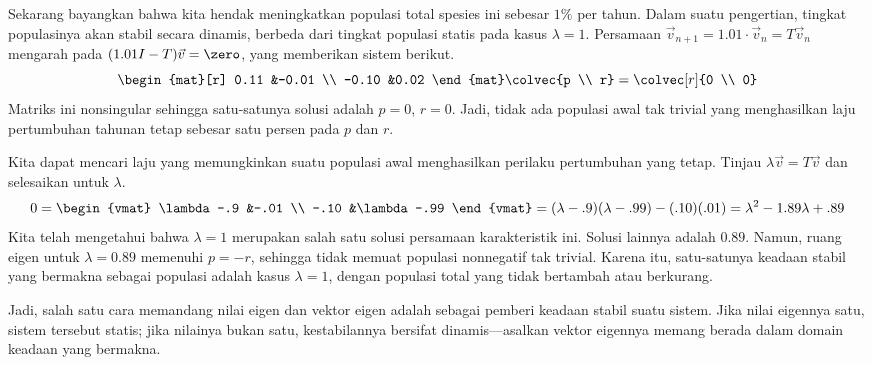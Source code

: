 Sekarang bayangkan bahwa kita hendak meningkatkan populasi total spesies ini
sebesar $1\%$ per tahun. Dalam suatu pengertian, tingkat populasinya akan stabil
secara dinamis, berbeda dari tingkat populasi statis pada kasus $\lambda=1$.
Persamaan $\vec{v}_{n+1}=1.01\cdot\vec{v}_n=T\vec{v}_{n}$ mengarah pada
$(1.01 I-T)\vec{v}=\zero$, yang memberikan sistem berikut.
\begin{equation*}
  \begin{mat}[r]
     0.11   &-0.01  \\
     -0.10  &0.02
  \end{mat}
  \colvec{p \\ r}=
  \colvec[r]{0 \\ 0}
\end{equation*}
Matriks ini nonsingular sehingga satu-satunya solusi adalah $p=0$, $r=0$.
Jadi, tidak ada populasi awal tak trivial yang menghasilkan laju pertumbuhan
tahunan tetap sebesar satu persen pada $p$ dan $r$.

Kita dapat mencari laju yang memungkinkan suatu populasi awal menghasilkan
perilaku pertumbuhan yang tetap. Tinjau $\lambda\vec{v}=T\vec{v}$ dan
selesaikan untuk $\lambda$.
\begin{equation*}
  0=\begin{vmat}
    \lambda-.9  &-.01  \\
    -.10        &\lambda-.99
  \end{vmat}
  =(\lambda-.9)(\lambda-.99)-(.10)(.01)
  =\lambda^2-1.89\lambda+.89
\end{equation*}
Kita telah mengetahui bahwa $\lambda=1$ merupakan salah satu solusi persamaan
karakteristik ini. Solusi lainnya adalah $0.89$. Namun, ruang eigen untuk
$\lambda=0.89$ memenuhi $p=-r$, sehingga tidak memuat populasi nonnegatif tak
trivial. Karena itu, satu-satunya keadaan stabil yang bermakna sebagai populasi
adalah kasus $\lambda=1$, dengan populasi total yang tidak bertambah atau
berkurang.
 
Jadi, salah satu cara memandang nilai eigen dan vektor eigen adalah sebagai
pemberi keadaan stabil suatu sistem. Jika nilai eigennya satu, sistem tersebut
statis; jika nilainya bukan satu, kestabilannya bersifat dinamis---asalkan
vektor eigennya memang berada dalam domain keadaan yang bermakna.





